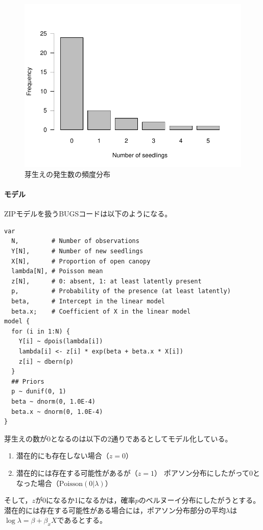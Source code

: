\documentclass[11pt,uplatex]{jsarticle}
\begin{document}
\begin{figure}[hbtp]
  \begin{center}
    \includegraphics[bb=0 0 360 270, clip, width=300 bp]{example4_barplot.pdf}
  \end{center}
  \caption{芽生えの発生数の頻度分布}
  \label{example4_barplot}
\end{figure}

\vspace{2zw}

\paragraph{モデル}
ZIPモデルを扱うBUGSコードは以下のようになる。

\begin{lstlisting}
var
  N,         # Number of observations
  Y[N],      # Number of new seedlings
  X[N],      # Proportion of open canopy
  lambda[N], # Poisson mean
  z[N],      # 0: absent, 1: at least latently present
  p,         # Probability of the presence (at least latently)
  beta,      # Intercept in the linear model
  beta.x;    # Coefficient of X in the linear model
model {
  for (i in 1:N) {
    Y[i] ~ dpois(lambda[i])
    lambda[i] <- z[i] * exp(beta + beta.x * X[i])
    z[i] ~ dbern(p)
  }
  ## Priors
  p ~ dunif(0, 1)
  beta ~ dnorm(0, 1.0E-4)
  beta.x ~ dnorm(0, 1.0E-4)
}
\end{lstlisting}


芽生えの数が0となるのは以下の2通りであるとしてモデル化している。
\begin{enumerate}
\item 潜在的にも存在しない場合（$z=0$）
\item 潜在的には存在する可能性があるが（$z=1$）
ポアソン分布にしたがって0となった場合（$\mathrm{Poisson}(0|\lambda)$）
\end{enumerate}
そして，$z$が0になるか1になるかは，確率$p$のベルヌーイ分布にしたがうとする。
潜在的には存在する可能性がある場合には，ポアソン分布部分の平均$\lambda$は
$\log\lambda = \beta + \beta_{x}X$であるとする。
\end{document}
